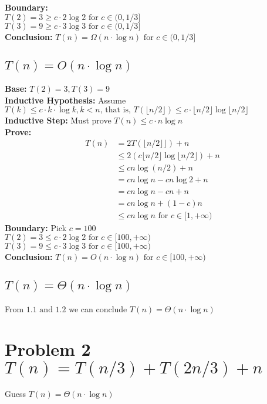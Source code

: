 \documentclass[a4paper]{article}
\begin{document}
\textbf{Boundary:} \\
$T(2)=3\geq c\cdot 2\log 2 \text{ for } c\in (0,1/3]$\\ 
$T(3)=9 \geq c\cdot 3\log3 \text{ for } c\in (0,1/3]$\\
\textbf{Conclusion: }$T(n)= \Omega(n\cdot \log n)\text{ for } c\in (0,1/3] $

\subsection{$T(n)= O(n\cdot \log n)$}

\textbf{Base:} $T(2)=3, T(3)=9$\\
\textbf{Inductive Hypothesis:} Assume $T(k)\leq c\cdot k \cdot \log{k}, k< n\text{, that is, }T(\lfloor{n/2}\rfloor)\leq c\cdot \lfloor{n/2}\rfloor\log{\lfloor{n/2}\rfloor}$\\
\textbf{Inductive Step:} Must prove $T(n)\leq c\cdot n\log{n}$\\
\textbf{Prove:}
\begin{align*}
    T(n) & = 2T(\lfloor{n/2}\rfloor⌋) + n \\
    & \leq 2(c\lfloor{n/2}\rfloor\log{\lfloor{n/2}\rfloor})+n \\ 
    & \leq cn\log{(n/2)}+n \\
    & = cn \log{n} -cn\log{2}+n\\
    & = cn \log n - cn+n \\
    & = cn \log n +(1-c)n \\
    & \leq cn \log n \text{ for } c\in[1,+\infty)
\end{align*}
\textbf{Boundary:} Pick $c=100$\\
$T(2)=3\leq c\cdot 2\log 2 \text{ for } c\in[100,+\infty)$\\ 
$T(3)=9 \leq c\cdot 3\log3 \text{ for } c\in[100,+\infty)$\\
\textbf{Conclusion: }$T(n)= O(n\cdot \log n)\text{ for } c\in[100,+\infty) $

\subsection{$T(n)= \Theta(n\cdot \log n)$}
From $1.1 \text{ and } 1.2$ we can conclude {$T(n)= \Theta(n\cdot \log n)$}

\section{Problem 2 $T(n) = T(n/3) + T(2n/3) + n$} 
Guess $T(n)=\Theta(n\cdot \log n)$
\end{document}
